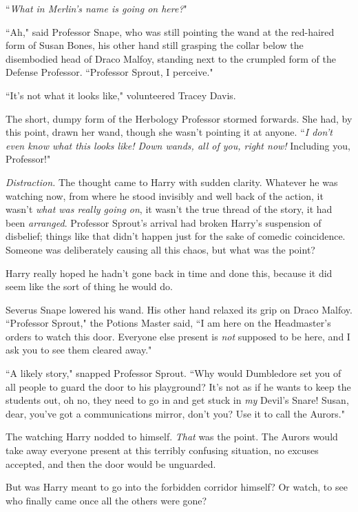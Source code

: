 ``\emph{What in Merlin's name is going on here?}"

``Ah," said Professor Snape, who was still pointing the wand at the red-haired form of Susan Bones, his other hand still grasping the collar below the disembodied head of Draco Malfoy, standing next to the crumpled form of the Defense Professor. ``Professor Sprout, I perceive."

``It's not what it looks like," volunteered Tracey Davis.

The short, dumpy form of the Herbology Professor stormed forwards. She had, by this point, drawn her wand, though she wasn't pointing it at anyone. ``\emph{I don't even know what this looks like! \emph{Down wands, all of you,} right now!} Including you, Professor!"

\emph{Distraction.} The thought came to Harry with sudden clarity. Whatever he was watching now, from where he stood invisibly and well back of the action, it wasn't \emph{what was really going on}, it wasn't the true thread of the story, it had been \emph{arranged}. Professor Sprout's arrival had broken Harry's suspension of disbelief; things like that didn't happen just for the sake of comedic coincidence. Someone was deliberately causing all this chaos, but what was the point?

Harry really hoped he hadn't gone back in time and done this, because it did seem like the sort of thing he would do.

Severus Snape lowered his wand. His other hand relaxed its grip on Draco Malfoy. ``Professor Sprout," the Potions Master said, ``I am here on the Headmaster's orders to watch this door. Everyone else present is \emph{not} supposed to be here, and I ask you to see them cleared away."

``A likely story," snapped Professor Sprout. ``Why would Dumbledore set you of all people to guard the door to his playground? It's not as if he wants to keep the students out, oh no, they need to go in and get stuck in \emph{my} Devil's Snare! Susan, dear, you've got a communications mirror, don't you? Use it to call the Aurors."

The watching Harry nodded to himself. \emph{That} was the point. The Aurors would take away everyone present at this terribly confusing situation, no excuses accepted, and then the door would be unguarded.

But was Harry meant to go into the forbidden corridor himself? Or watch, to see who finally came once all the others were gone?

